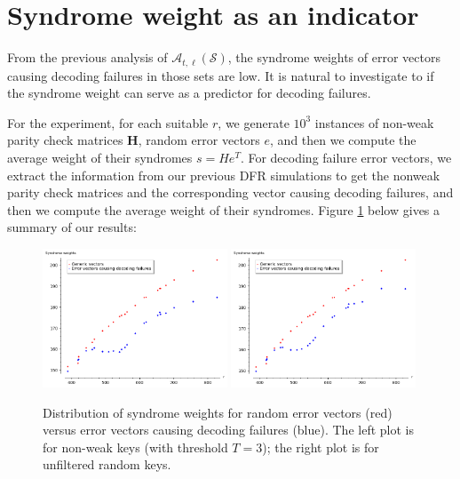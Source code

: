 \section{Syndrome weight as an indicator}

From the previous analysis of $\mathcal{A}_{t,\ell}(\mathcal{S})$, the syndrome weights of error vectors causing decoding failures in those sets are low. It is natural to investigate to if the syndrome weight can serve as a predictor for decoding failures. 

For the experiment, for each suitable $r$, we generate $10^3$ instances of non-weak parity check matrices $\mathbf{H}$, random error vectors $e$, and then we compute the average weight of their syndromes $s=He^T$. For decoding failure error vectors, we extract the information from our previous DFR simulations to get the nonweak parity check matrices and the corresponding vector causing decoding failures, and then we compute the average weight of their syndromes. Figure \ref{fig:syndrome-weights} below gives a summary of our results:

\begin{figure}[htbp]
  \begin{center}
    \includegraphics[width=0.49\textwidth]{2_bike/average_sw_generic_vs_DF_T3.png}
    \includegraphics[width=0.49\textwidth]{2_bike/average_sw_generic_vs_DF_random.png}
  \end{center}
  \caption{Distribution of syndrome weights for random error vectors (red) versus error vectors causing decoding failures (blue). The left plot is for non-weak keys (with threshold $T = 3$); the right plot is for unfiltered random keys.}
  \label{fig:syndrome-weights}
\end{figure}

